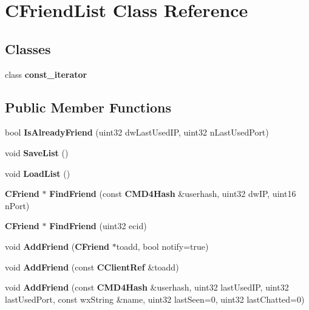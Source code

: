 \section{CFriendList Class Reference}
\label{classCFriendList}
\subsection*{Classes}
\begin{DoxyCompactItemize}
\item 
class {\bf const\_\-iterator}
\end{DoxyCompactItemize}
\subsection*{Public Member Functions}
\begin{DoxyCompactItemize}
\item 
bool {\bfseries IsAlreadyFriend} (uint32 dwLastUsedIP, uint32 nLastUsedPort)\label{classCFriendList_a962e1eaad4180120fedfba0b1eb770b2}

\item 
void {\bfseries SaveList} ()\label{classCFriendList_a4eaa4f709feb1a75edf67f1f9a93060d}

\item 
void {\bfseries LoadList} ()\label{classCFriendList_a56c457fa1526657d485418d52038d0cc}

\item 
{\bf CFriend} $\ast$ {\bfseries FindFriend} (const {\bf CMD4Hash} \&userhash, uint32 dwIP, uint16 nPort)\label{classCFriendList_a0c529a7857981521e7520e3c4dee42c2}

\item 
{\bf CFriend} $\ast$ {\bfseries FindFriend} (uint32 ecid)\label{classCFriendList_a6511bb238500392324b7d0f923c41908}

\item 
void {\bfseries AddFriend} ({\bf CFriend} $\ast$toadd, bool notify=true)\label{classCFriendList_aaac67445187e08afc156d0828099656d}

\item 
void {\bfseries AddFriend} (const {\bf CClientRef} \&toadd)\label{classCFriendList_ad16de5ae2f1aa85a63c6fb824d3f68b1}

\item 
void {\bfseries AddFriend} (const {\bf CMD4Hash} \&userhash, uint32 lastUsedIP, uint32 lastUsedPort, const wxString \&name, uint32 lastSeen=0, uint32 lastChatted=0)\label{classCFriendList_a38310e1c2f320c8cd2776531361cb843}


\end{DoxyCompactItemize}

